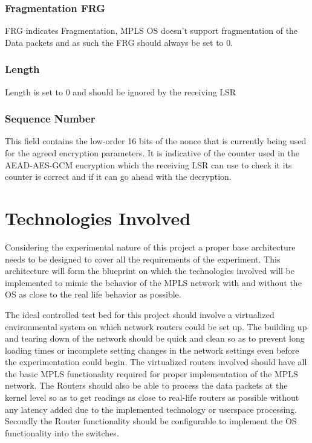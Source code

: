 \subsubsection*{Fragmentation FRG}
FRG indicates Fragmentation, MPLS OS doesn't support fragmentation of the Data packets and as such the FRG should always be set to 0.

\subsubsection*{Length}
Length is set to 0 and should be ignored by the receiving LSR

\subsubsection*{Sequence Number}
This field contains the low-order 16 bits of the nonce that is currently being used for the agreed encryption parameters. It is indicative of the counter used in the AEAD-AES-GCM encryption which the receiving LSR can use to check it its counter is correct and if it can go ahead with the decryption.

\section{Technologies Involved}
Considering the experimental nature of this project a proper base architecture needs to be designed to cover all the requirements of the experiment. This architecture will form the blueprint on which the technologies involved will be implemented to mimic the behavior of the MPLS network with and without the OS as close to the real life behavior as possible.

The ideal controlled test bed for this project should involve a virtualized environmental system on which network routers could be set up. The building up and tearing down of the network should be quick and clean so as to prevent long loading times or incomplete setting changes in the network settings even before the experimentation could begin. The virtualized routers involved should have all the basic MPLS functionality required for proper implementation of the MPLS network. The Routers should also be able to process the data packets at the kernel level so as to get readings as close to real-life routers as possible without any latency added due to the implemented technology or userspace processing. Secondly the Router functionality should be configurable to implement the OS functionality into the switches.

